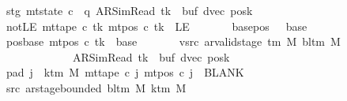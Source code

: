 \begin{isabellebody}
\ \ \ \ \ \ \ stg{\isacharcolon}{\kern0pt}\ {\isachardoublequoteopen}mt{\isacharunderscore}{\kern0pt}state\ c{\isacharprime}{\kern0pt}\ {\isacharequal}{\kern0pt}\ {\isacharparenleft}{\kern0pt}q{\isacharcomma}{\kern0pt}\ AR{\isacharunderscore}{\kern0pt}SimRead{\isacharcomma}{\kern0pt}\ tk{\isacharcomma}{\kern0pt}\ {}{\isacharcomma}{\kern0pt}\ buf{\isacharcomma}{\kern0pt}\ dvec{\isacharcomma}{\kern0pt}\ posk{\isacharparenright}{\kern0pt}{\isachardoublequoteclose}\isanewline
\ \ \ \ \ \ \ notLE{\isacharcolon}{\kern0pt}\ {\isachardoublequoteopen}mt{\isacharunderscore}{\kern0pt}tape\ c{\isacharprime}{\kern0pt}\ tk\ {\isacharparenleft}{\kern0pt}mt{\isacharunderscore}{\kern0pt}pos\ c{\isacharprime}{\kern0pt}\ tk{\isacharparenright}{\kern0pt}\ {\isasymnoteq}\ LE{}{\isachardoublequoteclose}\isanewline
\ \ \ \ \ \ \ base{\isacharunderscore}{\kern0pt}pos{\isacharcolon}{\kern0pt}\ {\isachardoublequoteopen}{}\ {\isacharless}{\kern0pt}\ base{\isachardoublequoteclose}\isanewline
\ \ \ \ \ \ \ pos{\isacharunderscore}{\kern0pt}base{\isacharcolon}{\kern0pt}\ {\isachardoublequoteopen}mt{\isacharunderscore}{\kern0pt}pos\ c{\isacharprime}{\kern0pt}\ tk\ {\isacharequal}{\kern0pt}\ base{\isachardoublequoteclose}\isanewline
\ \ \ \ \ \ \ vsrc{\isacharcolon}{\kern0pt}\ {\isachardoublequoteopen}ar{\isacharunderscore}{\kern0pt}valid{\isacharunderscore}{\kern0pt}stage\ {\isacharparenleft}{\kern0pt}{\isasymGamma}{\isacharunderscore}{\kern0pt}tm\ M{\isacharparenright}{\kern0pt}\ {\isacharparenleft}{\kern0pt}bl{\isacharunderscore}{\kern0pt}tm\ M{\isacharparenright}{\kern0pt}\isanewline
\ \ \ \ \ \ \ \ \ \ \ \ \ \ \ \ \ \ \ {\isacharparenleft}{\kern0pt}AR{\isacharunderscore}{\kern0pt}SimRead{\isacharcomma}{\kern0pt}\ tk{\isacharcomma}{\kern0pt}\ {}{\isacharcomma}{\kern0pt}\ buf{\isacharcomma}{\kern0pt}\ dvec{\isacharcomma}{\kern0pt}\ posk{\isacharparenright}{\kern0pt}{\isachardoublequoteclose}\isanewline
\ \ \ \ \ \ \ pad{}{\isacharcolon}{\kern0pt}\ {\isachardoublequoteopen}{\isasymforall}j\ {\isasymge}\ k{\isacharunderscore}{\kern0pt}tm\ M{\isachardot}{\kern0pt}\ mt{\isacharunderscore}{\kern0pt}tape\ c{\isacharprime}{\kern0pt}\ j\ {\isacharparenleft}{\kern0pt}mt{\isacharunderscore}{\kern0pt}pos\ c{\isacharprime}{\kern0pt}\ j{\isacharparenright}{\kern0pt}\ {\isacharequal}{\kern0pt}\ BLANK{}{\isachardoublequoteclose}\isanewline
\ \ \ \ \ \ \ src{}{\isacharcolon}{\kern0pt}\ {\isachardoublequoteopen}ar{\isacharunderscore}{\kern0pt}stage{\isacharunderscore}{\kern0pt}bounded\ {\isacharparenleft}{\kern0pt}bl{\isacharunderscore}{\kern0pt}tm\ M{\isacharparenright}{\kern0pt}\ {\isacharparenleft}{\kern0pt}k{\isacharunderscore}{\kern0pt}tm\ M{\isacharparenright}{\kern0pt}\isanewline

\end{isabellebody}
